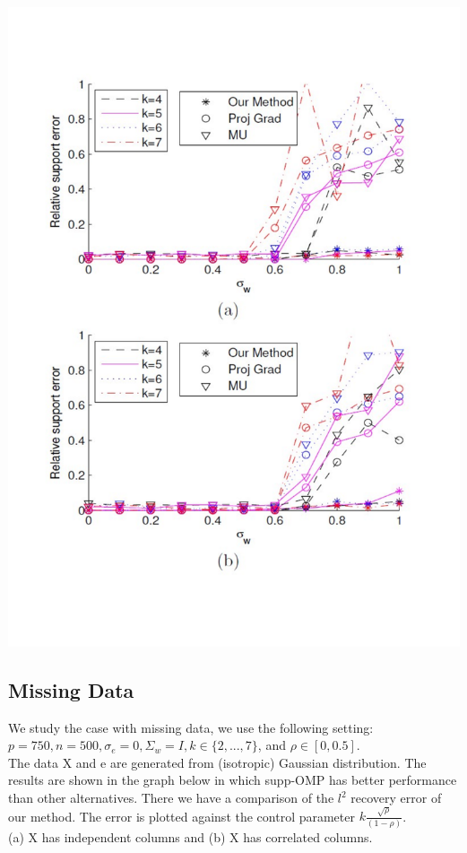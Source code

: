 \documentclass[a4paper,10pt]{article}
\theoremstyle{definition}
\begin{document}
\includegraphics[scale=0.5]{relative_support_error.pdf}

\subsection{Missing Data}
We study the case with missing data, we use the following setting:\\
$p=750, n=500, \sigma_e = 0, \Sigma_w = I, k\in \{2,...,7\}$, and $\rho \in [0,0.5]$.\\
The data X and e are generated from (isotropic) Gaussian distribution. The results are shown in the graph below in which supp-OMP has better performance than other alternatives. There we have a comparison of the $l^2$ recovery error of our method. The error is plotted against the control parameter $k\frac{\sqrt{\rho}}{(1-\rho)}$.\\
(a) X has independent columns and (b) X has correlated columns.
\end{document}

